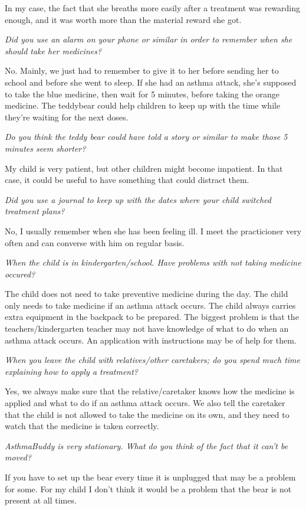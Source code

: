 In my case, the fact that she breaths more easily after a treatment was rewarding enough, and it was worth more than the material reward she got. 

\emph{Did you use an alarm on your phone or similar in order to remember when she should take her medicines?}

No. Mainly, we just had to remember to give it to her before sending her to school and before she went to sleep. 
If she had an asthma attack, she's supposed to take the blue medicine, then wait for 5 minutes, before taking the orange medicine. The teddybear could help children to keep up with the time while they're waiting for the next doses. 

\emph{Do you think the teddy bear could have told a story or similar to make those 5 minutes seem shorter?}

My child is very patient, but other children might become impatient. In that case, it could be useful to have something that could distract them. 

\emph{Did you use a journal to keep up with the dates where your child switched treatment plans?}

No, I usually remember when she has been feeling ill. I meet the practicioner very often and can converse with him on regular basis.

\emph{When the child is in kindergarten/school. Have problems with not taking medicine occured?}

The child does not need to take preventive medicine during the day. The child only needs to take medicine if an asthma attack occurs. The child always carries extra equipment in the backpack to be prepared. The biggest problem is that the teachers/kindergarten teacher may not have knowledge of what to do when an asthma attack occurs. An application with instructions may be of help for them. 


\emph{When you leave the child with relatives/other caretakers; do you spend much time explaining how to apply a treatment?}

Yes, we always make sure that the relative/caretaker knows how the medicine is applied and what to do if an asthma attack occurs. We also tell the caretaker that the child is not allowed to take the medicine on its own, and they need to watch that the medicine is taken correctly. 

\emph{AsthmaBuddy is very stationary. What do you think of the fact that it can't be moved?}

If you have to set up the bear every time it is unplugged that may be a problem for some. For my child I don't think it would be a problem that the bear is not present at all times.

